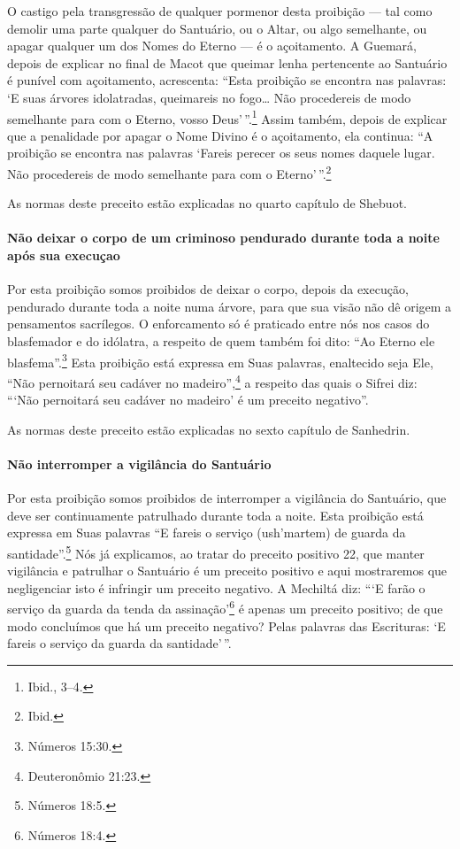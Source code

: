 \begin{multicols}{2}
O castigo pela transgressão de qualquer pormenor desta proibição --- tal
como demolir uma parte qualquer do Santuário, ou o Altar, ou algo
semelhante, ou apagar qualquer um dos Nomes do Eterno --- é o
açoitamento. A Guemará\starr, depois de explicar no final de Macot\starr{} que queimar
lenha pertencente ao Santuário é punível com açoitamento, acrescenta:
``Esta proibição se encontra nas palavras: `E suas árvores idolatradas,
queimareis no fogo\ldots{} Não procedereis de modo semelhante para com o
Eterno, vosso Deus'\,''.\footnote{Ibid., 3--4.} Assim também, depois de explicar
que a penalidade por apagar o Nome Divino é o açoitamento, ela continua:
``A proibição se encontra nas palavras `Fareis perecer os seus nomes
daquele lugar. Não procedereis de modo semelhante para com o Eterno'\,''.\footnote{Ibid.}

As normas deste preceito estão explicadas no quarto capítulo de Shebuot\starr.

\paragraph{Não deixar o corpo de um criminoso pendurado durante toda a
noite após sua execuçao}

Por esta proibição somos proibidos de deixar o corpo, depois da
execução, pendurado durante toda a noite numa árvore, para que sua visão
não dê origem a pensamentos sacrílegos. O enforcamento só é praticado
entre nós nos casos do blasfemador e do idólatra, a respeito de quem
também foi dito: ``Ao Eterno ele blasfema''.\footnote{Números 15:30.} Esta proibição está expressa em Suas palavras, enaltecido seja Ele, ``Não pernoitará seu cadáver no
madeiro'',\footnote{Deuteronômio 21:23.} a respeito das quais o Sifrei\starr{} diz:
```Não pernoitará seu cadáver no madeiro' é um preceito negativo''.

As normas deste preceito estão explicadas no sexto capítulo de Sanhedrin\starr.

\paragraph{Não interromper a vigilância do Santuário}

Por esta proibição somos proibidos de interromper a vigilância do
Santuário, que deve ser continuamente patrulhado durante toda a noite.
Esta proibição está expressa em Suas palavras ``E fareis o serviço
(ush'martem) de guarda da santidade''.\footnote{Números 18:5.} Nós já explicamos,
ao tratar do preceito positivo 22, que manter vigilância e patrulhar o
Santuário é um preceito positivo e aqui mostraremos que negligenciar
isto é infringir um preceito negativo. A Mechiltá\starr{} diz: ```E farão o
serviço da guarda da tenda da assinação'\footnote{Números 18:4.} é apenas um
preceito positivo; de que modo concluímos que há um preceito negativo?
Pelas palavras das Escrituras: `E fareis o serviço da guarda da
santidade'\,''.


\end{multicols}
